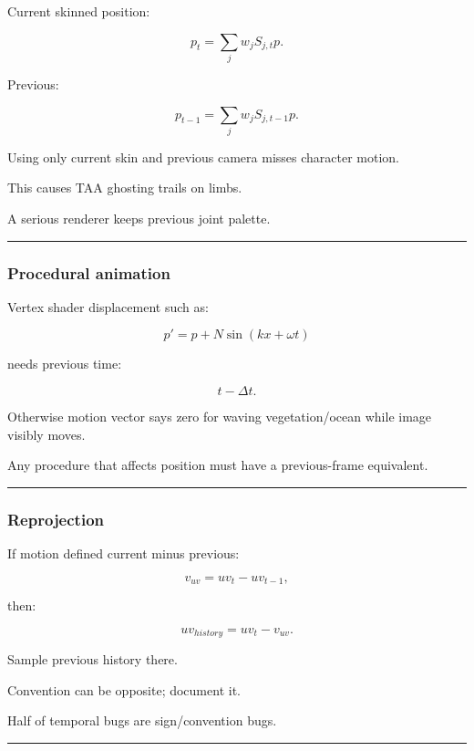 Current skinned position:

\[
p_t=
\sum_j
w_j
S_{j,t}p.
\]

Previous:

\[
p_{t-1}
=
\sum_j
w_j
S_{j,t-1}p.
\]

Using only current skin and previous camera misses character motion.

This causes TAA ghosting trails on limbs.

A serious renderer keeps previous joint palette.

\begin{center}\rule{0.5\linewidth}{0.5pt}\end{center}

\subsubsection{Procedural animation}\label{procedural-animation}

Vertex shader displacement such as:

\[
p'=p+
N\sin(
kx+\omega t
)
\]

needs previous time:

\[
t-\Delta t.
\]

Otherwise motion vector says zero for waving vegetation/ocean while image visibly moves.

Any procedure that affects position must have a previous-frame equivalent.

\begin{center}\rule{0.5\linewidth}{0.5pt}\end{center}

\subsubsection{Reprojection}\label{reprojection}

If motion defined current minus previous:

\[
v_{uv}
=
uv_t-uv_{t-1},
\]

then:

\[
\boxed{
uv_{history}
=
uv_t-v_{uv}.
}
\]

Sample previous history there.

Convention can be opposite; document it.

Half of temporal bugs are sign/convention bugs.

\begin{center}\rule{0.5\linewidth}{0.5pt}\end{center}

